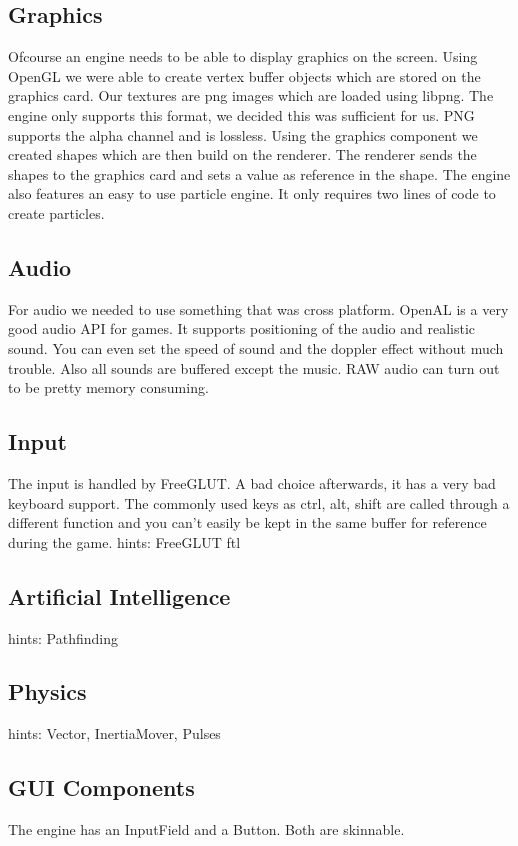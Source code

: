\documentclass[acmtocl,acmnow]{acmtrans2m}
\begin{document}
\subsection{Graphics}
Ofcourse an engine needs to be able to display graphics on the screen. Using OpenGL we were able to create vertex buffer objects which are stored on the graphics card. Our textures are png images which are loaded using libpng. The engine only supports this format, we decided this was sufficient for us. PNG supports the alpha channel and is lossless. Using the graphics component we created shapes which are then build on the renderer. The renderer sends the shapes to the graphics card and sets a value as reference in the shape. The engine also features an easy to use particle engine. It only requires two lines of code to create particles.
\subsection{Audio}
For audio we needed to use something that was cross platform. OpenAL is a very good audio API for games. It supports positioning of the audio and realistic sound. You can even set the speed of sound and the doppler effect without much trouble. Also all sounds are buffered except the music. RAW audio can turn out to be pretty memory consuming.
\subsection{Input}
The input is handled by FreeGLUT. A bad choice afterwards, it has a very bad keyboard support. The commonly used keys as ctrl, alt, shift are called through a different function and you can't easily be kept in the same buffer for reference during the game.
hints: FreeGLUT ftl
\subsection{Artificial Intelligence}
hints: Pathfinding
\subsection{Physics}
hints: Vector, InertiaMover, Pulses
\subsection{GUI Components}
The engine has an InputField and a Button. Both are skinnable.

\begin{thebibliography}{}

\end{thebibliography}

\begin{received}
\end{received}
\end{document}
